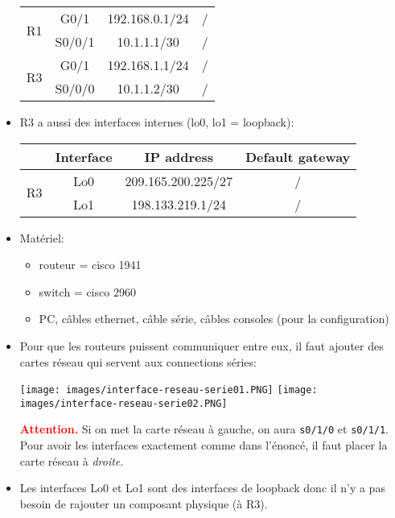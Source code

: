 \documentclass[a4paper]{article}
\begin{document}
\begin{itemize}
\begin{center}
\begin{tabular}{|c|c|c|c|}
        \multirow{2}{*}{R1}
        & G0/1 & 192.168.0.1/24 & / \\
        & S0/0/1 & 10.1.1.1/30 & / \\ \hline
        
        \multirow{2}{*}{R3}
        & G0/1 & 192.168.1.1/24 & / \\
        & S0/0/0 & 10.1.1.2/30 & / \\ \hline
    \end{tabular}
\end{center}





\item R3 a aussi des interfaces internes (lo0, lo1 = loopback):
\begin{center}
    \begin{tabular}{|c|c|c|c|} \hline
        & Interface & IP address & Default gateway \\ \hline

        \multirow{2}{*}{R3}
        & Lo0 & 209.165.200.225/27 & / \\
        & Lo1 & 198.133.219.1/24 & / \\ \hline
    \end{tabular}
\end{center}





\item Matériel:
\begin{itemize}
    \item routeur = cisco 1941
    \item switch = cisco 2960
    \item PC, câbles ethernet, câble série, câbles consoles (pour la configuration)
\end{itemize}





\item Pour que les routeurs puissent communiquer entre eux, il faut ajouter des cartes réseau qui servent aux connections séries:
\begin{center}
    \texttt{[image: images/interface-reseau-serie01.PNG]}
    \texttt{[image: images/interface-reseau-serie02.PNG]}
\end{center}
\textcolor{red}{\textbf{Attention.}} Si on met la carte réseau à gauche, on aura \texttt{s0/1/0} et \texttt{s0/1/1}. Pour avoir les interfaces exactement comme dans l'énoncé, il faut placer la carte réseau à \textit{droite}.





\item Les interfaces Lo0 et Lo1 sont des interfaces de loopback donc il n'y a pas besoin de rajouter un composant physique (à R3).





\end{itemize}
\end{document}
